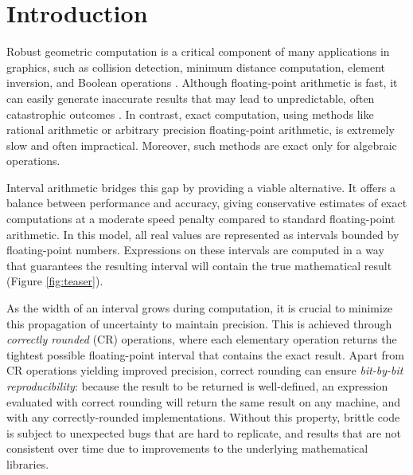 
\section{Introduction}
\label{sec:introduction}
Robust geometric computation is a critical component of many applications in graphics, such as collision detection, minimum distance computation, element inversion, and Boolean operations \cite{Sichetti2025}. 
Although floating-point arithmetic is fast, it can easily generate inaccurate results that may lead to unpredictable, often catastrophic outcomes \cite{Goldberg:1991,Bailey:2015}. 
In contrast, exact computation, using methods like rational arithmetic or arbitrary precision floating-point arithmetic, is extremely slow and often impractical.
Moreover, such methods are exact only for algebraic operations.

Interval arithmetic bridges this gap by providing a viable alternative.
It offers a balance between performance and accuracy, giving conservative estimates of exact computations at a moderate speed penalty compared to standard floating-point arithmetic. In this model, all real values are represented as intervals bounded by floating-point numbers. Expressions on these intervals are computed in a way that guarantees the resulting interval will contain the true mathematical result (Figure \ref{fig:teaser}).

As the width of an interval grows during computation, it is crucial to minimize this propagation of uncertainty to maintain precision. This is achieved through \emph{correctly rounded} (CR) operations, where each elementary operation returns the tightest possible floating-point interval that contains the exact result.
Apart from CR operations yielding improved precision, correct rounding can ensure \emph{bit-by-bit reproducibility}: because the result to be returned is well-defined, an expression evaluated with correct rounding will return the same result on any machine, and with any correctly-rounded implementations.
Without this property, brittle code is subject to unexpected bugs that are hard to replicate, and results that are not consistent over time due to improvements to the underlying mathematical libraries.

%

